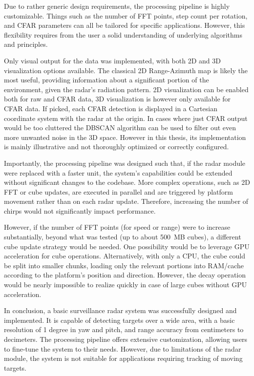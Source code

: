 Due to rather generic design requirements, the processing pipeline is highly customizable.
Things such as the number of FFT points, step count per rotation, and CFAR parameters can all be tailored for specific applications.
However, this flexibility requires from the user a solid understanding of underlying algorithms and principles.

Only visual output for the data was implemented, with both 2D and 3D visualization options available.
The classical 2D Range-Azimuth map is likely the most useful, providing information about a significant portion of the environment, given the radar’s radiation pattern.
2D visualization can be enabled both for raw and CFAR data, 3D visualization is however only available for CFAR data.
If picked, each CFAR detection is displayed in a Cartesian coordinate system with the radar at the origin.
In cases where just CFAR output would be too cluttered the DBSCAN algorithm can be used to filter out even more unwanted noise in the 3D space.
However in this thesis, its implementation is mainly illustrative and not thoroughly optimized or correctly configured.

Importantly, the processing pipeline was designed such that, if the radar module were replaced with a faster unit, the system’s capabilities could be extended without significant changes to the codebase.
More complex operations, such as 2D FFT or cube updates, are executed in parallel and are triggered by platform movement rather than on each radar update.
Therefore, increasing the number of chirps would not significantly impact performance.

However, if the number of FFT points (for speed or range) were to increase substantially, beyond what was tested (up to about 500~MB cubes), a different cube update strategy would be needed.
One possibility would be to leverage GPU acceleration for cube operations.
Alternatively, with only a CPU, the cube could be split into smaller chunks, loading only the relevant portions into RAM/cache according to the platform’s position and direction.
However, the decay operation would be nearly impossible to realize quickly in case of large cubes without GPU acceleration.

In conclusion, a basic surveillance radar system was successfully designed and implemented.
It is capable of detecting targets over a wide area, with a basic resolution of 1 degree in yaw and pitch, and range accuracy from centimeters to decimeters.
The processing pipeline offers extensive customization, allowing users to fine-tune the system to their needs.
However, due to limitations of the radar module, the system is not suitable for applications requiring tracking of moving targets.
